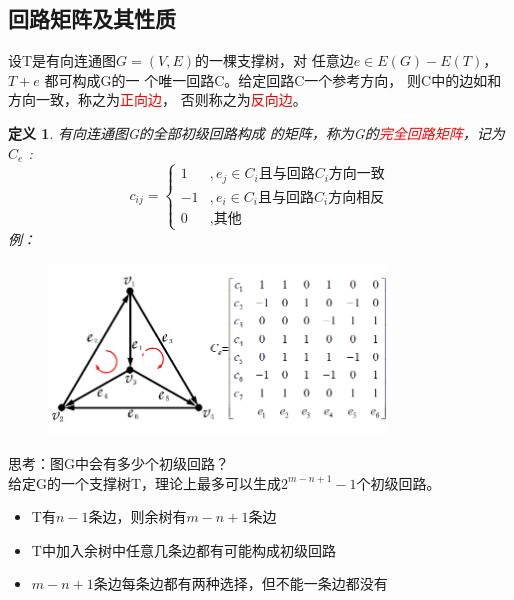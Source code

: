 \documentclass[11pt,a4paper,openany]{book}
\newcommand{\hwxw}{\CJKfamily{hwxw}}
\newtheorem{defination}{\textbf{定义}}[section]
\begin{document}
\subsection{回路矩阵及其性质}
设T是有向连通图$G=(V,E)$的一棵支撑树，对
任意边$e\in E(G)-E(T)$，$T+e$ 都可构成G的一
个唯一回路C。给定回路C一个参考方向，
则C中的边如和方向一致，称之为\textcolor{red}{正向边}，
否则称之为\textcolor{red}{反向边}。\\
\begin{defination}
有向连通图G的全部初级回路构成
的矩阵，称为G的\textcolor{red}{完全回路矩阵}，记为$C_e$ :
\begin{equation*}
  c_{ij}=\begin{cases}
1 & ,e_j\in C_i \text{且与回路}C_i\text{方向一致}\\
-1 & ,e_i\in C_i \text{且与回路}C_i \text{方向相反}\\
0 &,\text{其他}
\end{cases}
\end{equation*}
例：\\
\begin{figure}[H]
  \centering
  \includegraphics[width=0.8\textwidth]{ce.png}\\
  \caption*{}
\end{figure}
\end{defination}
\begin{shaded}
{\hwxw 思考：图G中会有多少个初级回路？}\\
给定G的一个支撑树T，理论上最多可以生成$2^{m-n+1}-1$个初级回路。
\begin{itemize}
  \item T有$n-1$条边，则余树有$m-n+1$条边
  \item T中加入余树中任意几条边都有可能构成初级回路
  \item $m-n+1$条边每条边都有两种选择，但不能一条边都没有
\end{itemize}
\end{shaded}
\end{document}
